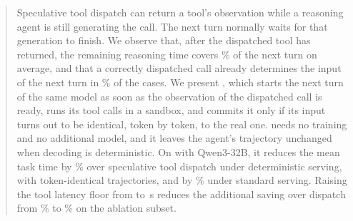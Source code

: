 \begin{abstract}
Speculative tool dispatch can return a tool's observation while a reasoning agent is still generating the call. The next turn normally waits for that generation to finish.
We observe that, after the dispatched tool has returned, the remaining reasoning time covers \MotNextCoveredPct\% of the next turn on average, and that a correctly dispatched call already determines the input of the next turn in \MotInputSamePct\% of the cases.
We present \method, which starts the next turn of the same model as soon as the observation of the dispatched call is ready, runs its tool calls in a sandbox, and commits it only if its input turns out to be identical, token by token, to the real one.
\method needs no training and no additional model, and it leaves the agent's trajectory unchanged when decoding is deterministic.
On \taubench with Qwen3-32B, it reduces the mean task time by \DetSaveOursDisp\% over speculative tool dispatch under deterministic serving, with token-identical trajectories, and by \StdSaveOursDisp\% under standard serving.
Raising the tool latency floor from \ToolLowFloor{} to \ToolHighFloor\,s reduces the additional saving over dispatch from \ToolLowIncrement\% to \ToolHighIncrement\% on the ablation subset.
\end{abstract}
